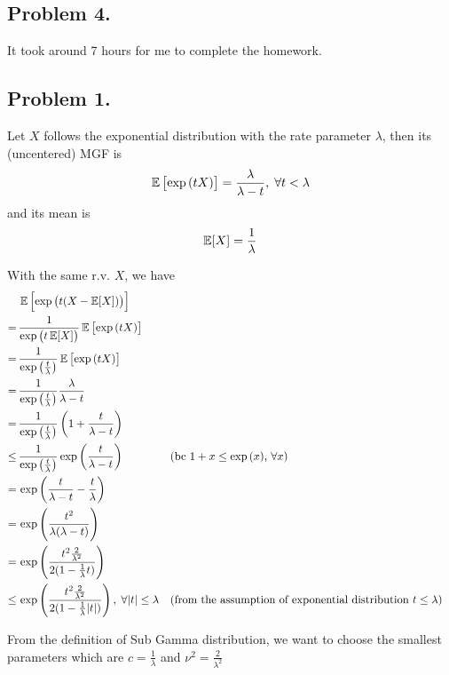 
\subsection*{Problem 4.}
It took around 7 hours for me to complete the homework.

\subsection*{Problem 1.}

Let $X$ follows the exponential distribution with the rate parameter $\lambda$, then its (uncentered) MGF is
\begin{align*}
  \EE\sbr{\exp \del{tX}} = \frac{ \lambda }{\lambda - t}, \; \forall t < \lambda
\end{align*}
and its mean is
\begin{align*}
  \operatorname{\mathbb{E}}[X] = \frac{1}{\lambda}
\end{align*}

With the same r.v. $X$, we have
\begin{align*}
  &\EE\sbr{\exp \del{t(X - \EE[X])}} \\
  \stackrel{}{=}\,&\frac{1}{\exp\del{t\EE[X]}}\EE\sbr{\exp \del{tX}} \\
  \stackrel{}{=}\,&\frac{1}{\exp\del{\frac{t}{\lambda}}}\EE\sbr{\exp \del{tX}} \\
  \stackrel{}{=}\,&\frac{1}{\exp\del{\frac{t}{\lambda}}}\frac{\lambda}{\lambda-t} \\
  \stackrel{}{=}\,&\frac{1}{\exp\del{\frac{t}{\lambda}}}\del{1+\frac{t}{\lambda-t}} \\
  \stackrel{}{\le}\,&\frac{1}{\exp\del{\frac{t}{\lambda}}}\exp\del{\frac{t}{\lambda-t}} && \mcmt{bc $1 + x \le \exp\del{x}$, $\forall x$} \\
  \stackrel{}{=}\,&\exp\del{\frac{t}{\lambda-t} - \frac{t}{\lambda}}  \\
  \stackrel{}{=}\,&\exp\del{\frac{t^2}{\lambda(\lambda-t)}} \\
  \stackrel{}{=}\,&\exp\del{\frac{t^2\frac{2}{\lambda^2}}{2(1-\frac{1}{\lambda}t)}} \\
  \stackrel{}{\le}\,&\exp\del{\frac{t^2\frac{2}{\lambda^2}}{2(1-\frac{1}{\lambda}\abs{t})}},\; \forall \abs{t} \le \lambda && \mcmt{from the assumption of exponential distribution $t \le \lambda$} \\
\end{align*}

From the definition of Sub Gamma distribution, we want to choose the smallest parameters which are $c = \frac{1}{\lambda}$ and $\nu^2 = \frac{2}{\lambda^2}$

